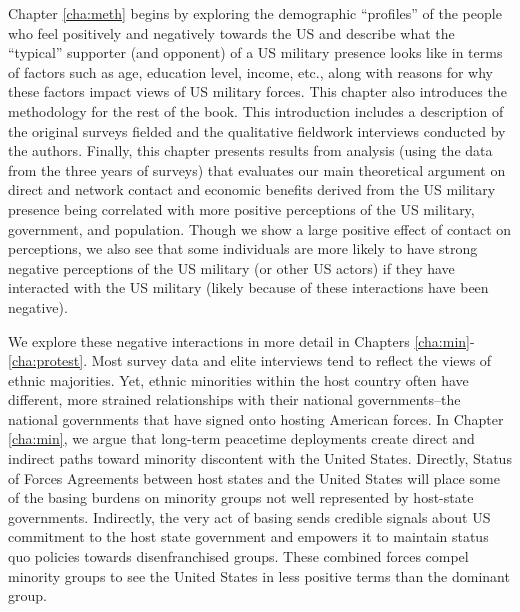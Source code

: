 Chapter \ref{cha:meth} begins by exploring the demographic ``profiles'' of the people who feel positively and negatively towards the US and describe what the ``typical'' supporter (and opponent) of a US military presence looks like in terms of factors such as age, education level, income, etc., along with reasons for why these factors impact views of US military forces. This chapter also introduces the methodology for the rest of the book. This introduction includes a description of the original surveys fielded and the qualitative fieldwork interviews conducted by the authors. Finally, this chapter presents results from analysis (using the data from the three years of surveys) that evaluates our main theoretical argument on direct and network contact and economic benefits derived from the US military presence being correlated with more positive perceptions of the US military, government, and population. Though we show a large positive effect of contact on perceptions, we also see that some individuals are more likely to have strong negative perceptions of the US military (or other US actors) if they have interacted with the US military (likely because of these interactions have been negative). 


We explore these negative interactions in more detail in Chapters \ref{cha:min}-\ref{cha:protest}. Most survey data and elite interviews tend to reflect the views of ethnic majorities. Yet, ethnic minorities within the host country often have different, more strained relationships with their national governments--the national governments that have signed onto hosting American forces. In Chapter \ref{cha:min}, we argue that long-term peacetime deployments create direct and indirect paths toward minority discontent with the United States. Directly, Status of Forces Agreements between host states and the United States will place some of the basing burdens on minority groups not well represented by host-state governments. Indirectly, the very act of basing sends credible signals about US commitment to the host state government and empowers it to maintain status quo policies towards disenfranchised groups. These combined forces compel minority groups to see the United States in less positive terms than the dominant group.

